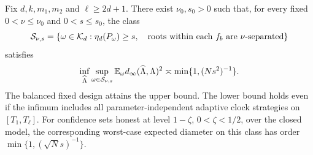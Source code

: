 \begin{theorem}\label{thm:poly-sharp}
Fix $d,k,m_1,m_2$ and $\ell\ge2d+1$. There exist $\nu_0,s_0>0$ such
that, for every fixed $0<\nu\le\nu_0$ and $0<s\le s_0$, the class
\[
 \mathcal S_{\nu,s}=\{\omega\in\mathcal K_d:
        \eta_d(P_\omega)\ge s,\quad
        \hbox{roots within each }f_b\hbox{ are }\nu\hbox{-separated}\}
\]
satisfies
\begin{equation}\label{eq:poly-minimax}
 \inf_{\widehat\Lambda}\sup_{\omega\in\mathcal S_{\nu,s}}
       \mathbb E_\omega d_\infty(\widehat\Lambda,\Lambda)^2
           \asymp\min\{1,(Ns^2)^{-1}\}.
\end{equation}
The balanced fixed design attains the upper bound. The lower bound
holds even if the infimum includes all parameter-independent adaptive
clock strategies on $[T_1,T_\ell]$. For confidence sets honest at level
$1-\zeta$, $0<\zeta<1/2$, over the closed model, the corresponding
worst-case expected diameter on this class has order
$\min\{1,(\sqrt Ns)^{-1}\}$.
\end{theorem}
